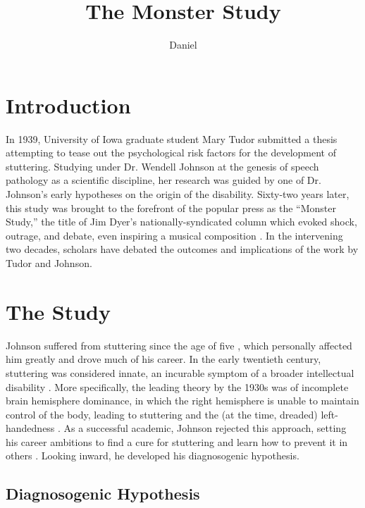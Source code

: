 \documentclass[american]{../../../coursework}
\title{The Monster Study}
\subtitle{}
\author{Daniel}{Glenn}{Leonard}
\date{\displaydate{date}}
\begin{document}
\setcounter{page}{71}
\maketitle

\section{Introduction}

In 1939, University of Iowa graduate student Mary Tudor submitted a
thesis attempting to tease out the psychological risk factors for the
development of stuttering. Studying under Dr. Wendell Johnson at the
genesis of speech pathology as a scientific discipline, her research was
guided by one of Dr. Johnson's early hypotheses on the origin of the
disability. Sixty-two years later, this study was brought to the
forefront of the popular press as the ``Monster Study,'' the title of
Jim Dyer's \parencite*{Dye01} nationally-syndicated column which evoked shock,
outrage, and debate, even inspiring a musical composition \parencite{Gar191}.
In the intervening two decades, scholars have debated the
outcomes and implications of the work by Tudor and Johnson.

\section{The Study}

Johnson suffered from stuttering since the age of five \parencite{GoldfarbEthics01},
which personally affected him greatly and drove much of his career. In
the early twentieth century, stuttering was considered innate, an
incurable symptom of a broader intellectual disability \parencite{GoldfarbEthics08}.
More specifically, the leading theory by the 1930s was of
incomplete brain hemisphere dominance, in which the right hemisphere is
unable to maintain control of the body, leading to stuttering and the
(at the time, dreaded) left-handedness \parencite{Sil88}. As a
successful academic, Johnson rejected this approach, setting his career
ambitions to find a cure for stuttering and learn how to prevent it in
others \parencite{GoldfarbEthics03}. Looking inward, he developed his
diagnosogenic hypothesis.

\subsection{Diagnosogenic Hypothesis}
\end{document}
